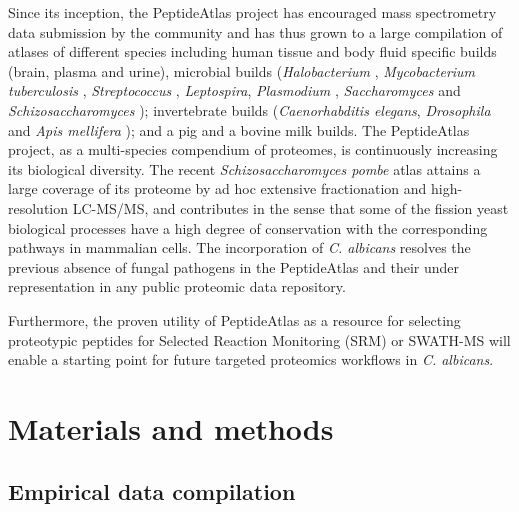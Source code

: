 Since its inception, the PeptideAtlas project \citep{Desiere2006} has 
encouraged mass spectrometry data submission by the community and
has thus grown to a large compilation of atlases of different
species including human tissue and body fluid specific builds
(brain, plasma \citep{Farrah2011} and urine), microbial builds (\textit{Halobacterium} \citep{Van2008a},
\textit{Mycobacterium tuberculosis} \citep{Schubert2013}, \textit{Streptococcus} \citep{Lange2008},
\textit{Leptospira}, \textit{Plasmodium} \citep{Lindner2013}, \textit{Saccharomyces} \citep{King2006}
and \textit{Schizosaccharomyces} \citep{Gunaratne2013b});
invertebrate builds (\textit{Caenorhabditis elegans}, \textit{Drosophila} \citep{Loevenich2009} and
\textit{Apis mellifera} \citep{Chan2011}); and a pig and a bovine milk \citep{Bislev2012} builds. The
PeptideAtlas project, as a multi-species compendium of
proteomes, is continuously increasing its biological diversity.
The recent  \textit{Schizosaccharomyces pombe} atlas \citep{Gunaratne2013b} attains a large
coverage of its proteome by ad hoc extensive fractionation and
high-resolution LC-MS/MS, and contributes in the sense that
some of the fission yeast biological processes have a high degree
of conservation with the corresponding pathways in mammalian
cells. The incorporation of \textit{C. albicans} resolves the previous
absence of fungal pathogens in the PeptideAtlas and their under
representation in any public proteomic data repository.

Furthermore, the proven utility of PeptideAtlas as a resource
for selecting proteotypic peptides for Selected Reaction Monitoring (SRM)
 \citep{Deutsch2008} or SWATH-MS \citep{Gillet2012} will enable a starting point
for future targeted proteomics workflows in \textit{C. albicans}.



\section*{Materials and methods}

\subsection*{Empirical data compilation}

